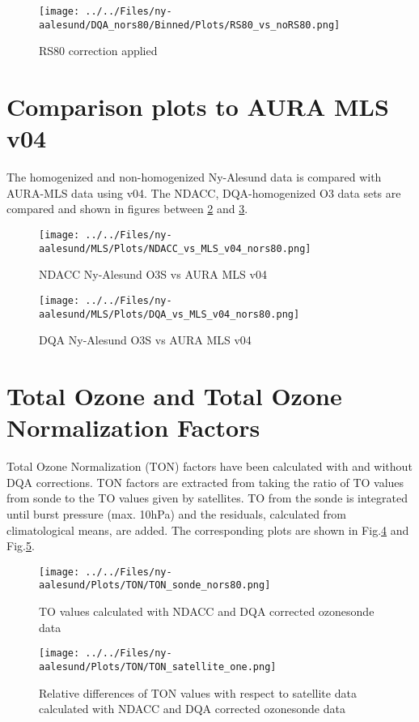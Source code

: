 \documentclass{article}
\begin{document}
                        \begin{figure}
        \centering
\texttt{[image: ../../Files/ny-aalesund/DQA\_nors80/Binned/Plots/RS80\_vs\_noRS80.png]}
    \caption{RS80 correction applied}
            \label{fig:rs80}
    \end{figure}
%
%
\section{Comparison plots to AURA MLS v04}

The homogenized and non-homogenized Ny-Alesund data is compared with AURA-MLS data using v04. The
NDACC, DQA-homogenized O3 data sets are compared and shown in figures between
\ref{fig:niwav04} and \ref{fig:dqav04_rs80}.

\begin{figure}
\centering
\texttt{[image: ../../Files/ny-aalesund/MLS/Plots/NDACC\_vs\_MLS\_v04\_nors80.png]}
\caption{ NDACC Ny-Alesund O3S vs AURA MLS v04  }
\label{fig:niwav04}
\end{figure}


\begin{figure}
\centering
\texttt{[image: ../../Files/ny-aalesund/MLS/Plots/DQA\_vs\_MLS\_v04\_nors80.png]}
\caption{DQA Ny-Alesund O3S vs AURA MLS v04 }
\label{fig:dqav04_rs80}
\end{figure}

        \section{Total Ozone and Total Ozone Normalization Factors}

Total Ozone Normalization (TON) factors have been calculated with and without DQA corrections. TON factors are
extracted
from taking the ratio of TO values from sonde to the TO values given by satellites. TO from the sonde is integrated until
burst pressure (max. 10hPa) and the residuals, calculated from climatological means, are added.
The corresponding plots are shown in Fig.\ref{fig:ton1} and  Fig.\ref{fig:ton2}.

                                \begin{figure}
        \centering
\texttt{[image: ../../Files/ny-aalesund/Plots/TON/TON\_sonde\_nors80.png]}
    \caption{TO values calculated with NDACC and DQA corrected ozonesonde data}
            \label{fig:ton1}
    \end{figure}

                                 \begin{figure}
        \centering
\texttt{[image: ../../Files/ny-aalesund/Plots/TON/TON\_satellite\_one.png]}
    \caption{Relative differences of TON values with respect to satellite data calculated with NDACC and DQA corrected ozonesonde data}
            \label{fig:ton2}
    \end{figure}
\end{document}
